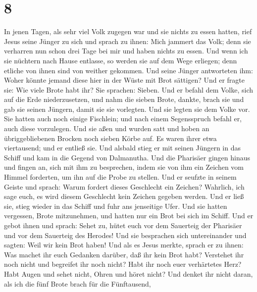 \hypertarget{section-7}{%
\section{8}\label{section-7}}

 In jenen Tagen, als sehr viel Volk zugegen war und sie
nichts zu essen hatten, rief Jesus seine Jünger zu sich und sprach zu
ihnen:  Mich jammert das Volk; denn sie verharren nun
schon drei Tage bei mir und haben nichts zu essen.  Und
wenn ich sie nüchtern nach Hause entlasse, so werden sie auf dem Wege
erliegen; denn etliche von ihnen sind von weither gekommen.
 Und seine Jünger antworteten ihm: Woher könnte jemand
diese hier in der Wüste mit Brot sättigen?  Und er fragte
sie: Wie viele Brote habt ihr? Sie sprachen: Sieben.  Und
er befahl dem Volke, sich auf die Erde niederzusetzen, und nahm die
sieben Brote, dankte, brach sie und gab sie seinen Jüngern, damit sie
sie vorlegten. Und sie legten sie dem Volke vor.  Sie
hatten auch noch einige Fischlein; und nach einem Segensspruch befahl
er, auch diese vorzulegen.  Und sie aßen und wurden satt
und hoben an übriggebliebenen Brocken noch sieben Körbe auf.
 Es waren ihrer etwa viertausend; und er entließ sie.
 Und alsbald stieg er mit seinen Jüngern in das Schiff
und kam in die Gegend von Dalmanutha.  Und die Pharisäer
gingen hinaus und fingen an, sich mit ihm zu besprechen, indem sie von
ihm ein Zeichen vom Himmel forderten, um ihn auf die Probe zu stellen.
 Und er seufzte in seinem Geiste und sprach: Warum
fordert dieses Geschlecht ein Zeichen? Wahrlich, ich sage euch, es wird
diesem Geschlecht kein Zeichen gegeben werden.  Und er
ließ sie, stieg wieder in das Schiff und fuhr ans jenseitige Ufer.
 Und sie hatten vergessen, Brote mitzunehmen, und hatten
nur ein Brot bei sich im Schiff.  Und er gebot ihnen und
sprach: Sehet zu, hütet euch vor dem Sauerteig der Pharisäer und vor dem
Sauerteig des Herodes!  Und sie besprachen sich
untereinander und sagten: Weil wir kein Brot haben!  Und
als es Jesus merkte, sprach er zu ihnen: Was machet ihr euch Gedanken
darüber, daß ihr kein Brot habt? Verstehet ihr noch nicht und begreifet
ihr noch nicht? Habt ihr noch euer verhärtetes Herz? 
Habt Augen und sehet nicht, Ohren und höret nicht? Und denket ihr nicht
daran,  als ich die fünf Brote brach für die Fünftausend,
